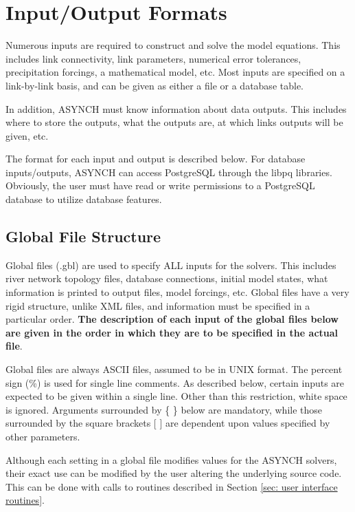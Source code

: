\documentclass[12pt]{article}
\begin{document}
\section{Input/Output Formats} \label{sec: input/output formats}

Numerous inputs are required to construct and solve the model equations. This includes link connectivity, link parameters, numerical error tolerances, precipitation forcings, a mathematical model, etc. Most inputs are specified on a link-by-link basis, and can be given as either a file or a database table.

In addition, ASYNCH must know information about data outputs. This includes where to store the outputs, what the outputs are, at which links outputs will be given, etc.

The format for each input and output is described below. For database inputs/outputs, ASYNCH can access PostgreSQL through the libpq libraries. Obviously, the user must have read or write permissions to a PostgreSQL database to utilize database features.

\subsection{Global File Structure} \label{sec: global file structure}

Global files (.gbl) are used to specify ALL inputs for the solvers. This includes river network topology files, database connections, initial model states, what information is printed to output files, model forcings, etc. Global files have a very rigid structure, unlike XML files, and information must be specified in a particular order. \textbf{The description of each input of the global files below are given in the order in which they are to be specified in the actual file}.

Global files are always ASCII files, assumed to be in UNIX format. The percent sign (\%) is used for single line comments. As described below, certain inputs are expected to be given within a single line. Other than this restriction, white space is ignored. Arguments surrounded by \{ \} below are mandatory, while those surrounded by the square brackets [ ] are dependent upon values specified by other parameters.

Although each setting in a global file modifies values for the ASYNCH solvers, their exact use can be modified by the user altering the underlying source code. This can be done with calls to routines described in Section \ref{sec: user interface routines}.
\end{document}
